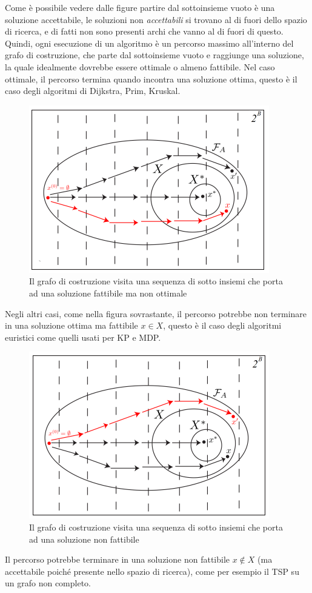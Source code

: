 \documentclass{article}
\begin{document}
    Come è possibile vedere dalle figure partire dal sottoinsieme vuoto è una soluzione accettabile,
    le soluzioni non \textit{accettabili} si trovano al di fuori dello spazio di ricerca, e di fatti
    non sono presenti archi che vanno al di fuori di questo. Quindi, ogni esecuzione di un algoritmo è un
    percorso massimo all'interno del grafo di costruzione, che parte dal sottoinsieme vuoto e raggiunge
    una soluzione, la quale idealmente dovrebbe essere ottimale o almeno fattibile. Nel caso ottimale,
    il percorso termina quando incontra una soluzione ottima, questo è il caso degli
    algoritmi di Dijkstra, Prim, Kruskal.
    \begin{figure}[H]
        \centering
        \includegraphics[scale=0.8]{images/cons_graph_1.png}
        \caption{Il grafo di costruzione visita una sequenza di sotto insiemi che porta ad una soluzione
            fattibile ma non ottimale}
    \end{figure}

    Negli altri casi, come nella figura sovrastante, il percorso potrebbe non terminare in una soluzione
    ottima ma fattibile $x\in X$, questo è il caso degli algoritmi euristici come quelli usati per
    KP e MDP.
    \begin{figure}[H]
        \centering
        \includegraphics[scale=0.8]{images/cons_graph_2.png}
        \caption{Il grafo di costruzione visita una sequenza di sotto insiemi che porta ad una soluzione non fattibile}
    \end{figure}
    Il percorso potrebbe terminare in una soluzione non fattibile $x\notin X$ (ma accettabile poiché presente
    nello spazio di ricerca), come per esempio il TSP su un grafo non completo.
\end{document}
